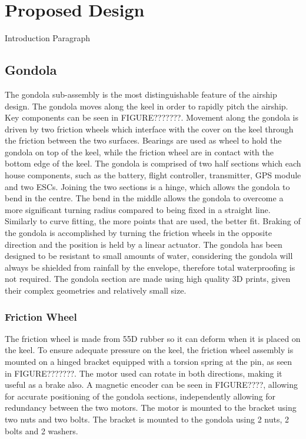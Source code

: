 \documentclass[../main.tex]{subfiles}
\begin{document}
\chapter{Proposed Design}
Introduction Paragraph
\section{Gondola}
The gondola sub-assembly is the most distinguishable feature of the airship design. The gondola moves along the keel in order to rapidly pitch the airship. Key components can be seen in FIGURE???????. Movement along the gondola is driven by two friction wheels which interface with the cover on the keel through the friction between the two surfaces. Bearings are used as wheel to hold the gondola on top of the keel, while the friction wheel are in contact with the bottom edge of the keel. The gondola is comprised of two half sections which each house components, such as the battery, flight controller, transmitter, GPS module and two ESCs. Joining the two sections is a hinge, which allows the gondola to bend in the centre. The bend in the middle allows the gondola to overcome a more significant turning radius compared to being fixed in a straight line. Similarly to curve fitting, the more points that are used, the better fit. Braking of the gondola is accomplished by turning the friction wheels in the opposite direction and the position is held by a linear actuator. The gondola has been designed to be resistant to small amounts of water, considering the gondola will always be shielded from rainfall by the envelope, therefore total waterproofing is not required. The gondola section are made using high quality 3D prints, given their complex geometries and relatively small size.
\\
\subsection{Friction Wheel}
The friction wheel is made from 55D rubber so it can deform when it is placed on the keel. To ensure adequate pressure on the keel, the friction wheel assembly is mounted on a hinged bracket equipped with a torsion spring at the pin, as seen in FIGURE???????. The motor used can rotate in both directions, making it useful as a brake also. A magnetic encoder can be seen in FIGURE????, allowing for accurate positioning of the gondola sections, independently allowing for redundancy between the two motors. The motor is mounted to the bracket using two nuts and two bolts. The bracket is mounted to the gondola using 2 nuts, 2 bolts and 2 washers.
\\
\end{document}
